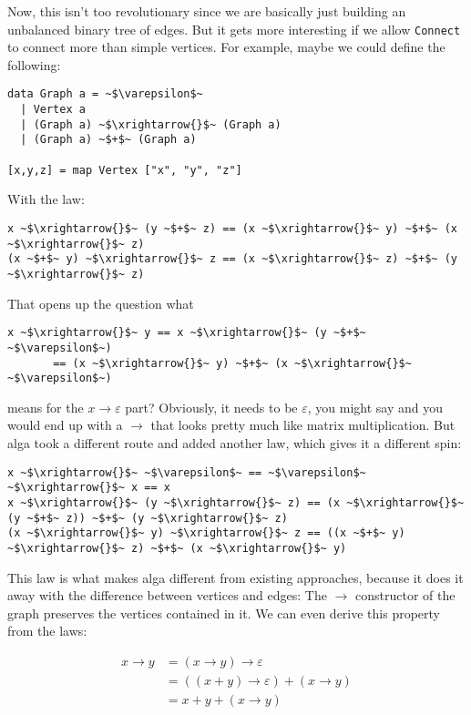 \documentclass[a4paper,twocolumn]{article}
\begin{document}
Now, this isn't too revolutionary since we are basically just building an unbalanced binary tree of edges.
But it gets more interesting if we allow \texttt{Connect} to connect more than simple vertices.
For example, maybe we could define the following:
\begin{verbatim}
data Graph a = ~$\varepsilon$~
  | Vertex a
  | (Graph a) ~$\xrightarrow{}$~ (Graph a)
  | (Graph a) ~$+$~ (Graph a)

[x,y,z] = map Vertex ["x", "y", "z"]
\end{verbatim}
With the law:
\begin{verbatim}
x ~$\xrightarrow{}$~ (y ~$+$~ z) == (x ~$\xrightarrow{}$~ y) ~$+$~ (x ~$\xrightarrow{}$~ z)
(x ~$+$~ y) ~$\xrightarrow{}$~ z == (x ~$\xrightarrow{}$~ z) ~$+$~ (y ~$\xrightarrow{}$~ z)
\end{verbatim}
That opens up the question what
\begin{verbatim}
x ~$\xrightarrow{}$~ y == x ~$\xrightarrow{}$~ (y ~$+$~ ~$\varepsilon$~)
       == (x ~$\xrightarrow{}$~ y) ~$+$~ (x ~$\xrightarrow{}$~ ~$\varepsilon$~)
\end{verbatim}
means for the $x \xrightarrow{} \varepsilon$ part?
Obviously, it needs to be $\varepsilon$, you might say and you would end up with
a $\xrightarrow{}$ that looks pretty much like matrix multiplication.
But alga took a different route and added another law, which gives it a different spin:
\begin{verbatim}
x ~$\xrightarrow{}$~ ~$\varepsilon$~ == ~$\varepsilon$~ ~$\xrightarrow{}$~ x == x
x ~$\xrightarrow{}$~ (y ~$\xrightarrow{}$~ z) == (x ~$\xrightarrow{}$~ (y ~$+$~ z)) ~$+$~ (y ~$\xrightarrow{}$~ z)
(x ~$\xrightarrow{}$~ y) ~$\xrightarrow{}$~ z == ((x ~$+$~ y) ~$\xrightarrow{}$~ z) ~$+$~ (x ~$\xrightarrow{}$~ y)
\end{verbatim}
This law is what makes alga different from existing approaches, because it does it away with the difference between vertices and edges:
The $\xrightarrow{}$ constructor of the graph preserves the vertices contained in it. We can even derive this property from the laws:

\begin{align*}
  x \xrightarrow{} y &= (x \xrightarrow{} y) \xrightarrow{} \varepsilon \\
  &= ((x + y) \xrightarrow{} \varepsilon) + (x \xrightarrow{} y) \\
  &= x + y + (x \xrightarrow{} y)
\end{align*}
\end{document}
